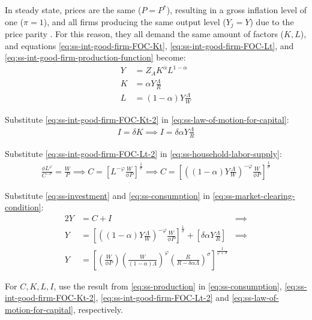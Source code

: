 \documentclass[
	12pt,
	]{article}
\numberwithin{equation}{section}
\theoremstyle{definition}
\theoremstyle{plain}
\theoremstyle{plain}
\theoremstyle{plain}
\begin{document}
In steady state, prices are the same ($P=P^\ast$), resulting in a gross inflation level of one ($\pi=1$), and all firms producing the same output level ($Y_j=Y$) due to the price parity \cite[Lecture 13, p.12]{solis-garcia_ucb_2022}. For this reason, they all demand the same amount of factors ($K,L$), and equations \ref{eq:ss-int-good-firm-FOC-Kt}, \ref{eq:ss-int-good-firm-FOC-Lt}, and \ref{eq:ss-int-good-firm-production-function} become:
\begin{align}
\label{eq:ss-int-good-firm-production-function-2}
	Y &= Z_{A} K^\alpha L^{1-\alpha}   \\
\label{eq:ss-int-good-firm-FOC-Kt-2}
	K &= \alpha Y \frac{\Lambda}{R}    \\
\label{eq:ss-int-good-firm-FOC-Lt-2}
	L &= (1-\alpha) Y \frac{\Lambda}{W}
\end{align}

Substitute \ref{eq:ss-int-good-firm-FOC-Kt-2} in \ref{eq:ss-law-of-motion-for-capital}:
\begin{align}
	\label{eq:ss-investment}
	I = \delta K \implies I = \delta \alpha Y \frac{\Lambda}{R}
\end{align}

Substitute \ref{eq:ss-int-good-firm-FOC-Lt-2} in \ref{eq:ss-household-labor-supply}:
\begin{align}
\label{eq:ss-consumption}
	\frac{\phi L^{\varphi}}{C^{-\sigma}} = \frac{W}{P}
\implies
	C = \left[ L^{-\varphi} \frac{W}{\phi P} \right]^{\frac{1}{\sigma}}
\implies
	C = \left[ \left( (1-\alpha) Y \frac{\Lambda}{W} \right)^{-\varphi} \frac{W}{\phi P} \right]^{\frac{1}{\sigma}}
\end{align}

Substitute \ref{eq:ss-investment} and \ref{eq:ss-consumption} in \ref{eq:ss-market-clearing-condition}:
\begin{alignat}{2}
	Y &= C + I &\implies \nonumber \\
	Y &= \left[ \left( (1-\alpha) Y \frac{\Lambda}{W} \right)^{-\varphi} \frac{W}{\phi P} \right]^{\frac{1}{\sigma}} + \left[ \delta \alpha Y \frac{\Lambda}{R} \right] &\implies \nonumber \\
	Y &=\left[
		\left( \frac{W}{\phi P}                \right)
		\left( \frac{W}{(1-\alpha)\Lambda}     \right)^\varphi
		\left( \frac{R}{R-\delta\alpha\Lambda} \right)^\sigma
		\right]^\frac{1}{\varphi+\sigma} & \label{eq:ss-production}
\end{alignat}

For $C,K,L,I$, use the result from \ref{eq:ss-production} in \ref{eq:ss-consumption}, \ref{eq:ss-int-good-firm-FOC-Kt-2}, \ref{eq:ss-int-good-firm-FOC-Lt-2} and \ref{eq:ss-law-of-motion-for-capital}, respectively.
\end{document}
